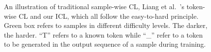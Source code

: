 \begin{figure}[th]
	\centering
	\begin{minipage}[t]{0.33\linewidth}
		\centering
	\end{minipage}%
	\begin{minipage}[t]{0.33\linewidth}
		\centering
	\end{minipage}%
	\begin{minipage}[t]{0.33\linewidth}
		\centering
	\end{minipage}%
	\centering
	\caption{An illustration of traditional sample-wise CL, Liang et al.~'s token-wise CL and our ICL, which all follow the easy-to-hard principle. 
Green box refers to samples in different difficulty levels. The darker, the harder. ``T'' refers to a known token while ``\_'' refer to a token to be
generated in the output sequence of a sample during training.}
	\label{fig:intro}
\end{figure}

